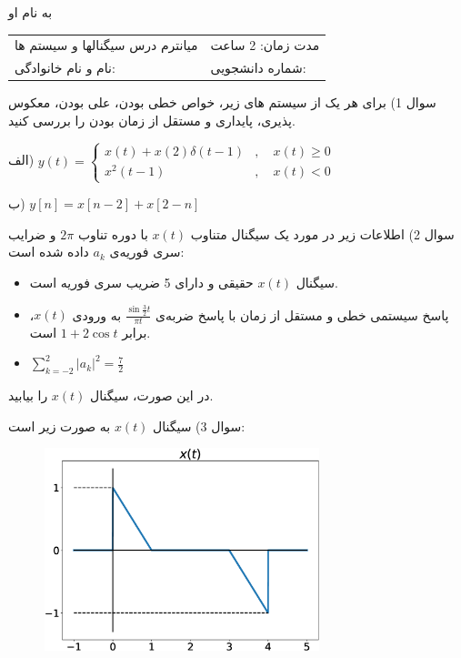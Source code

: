 \documentclass{article}
\begin{document}
{
\huge


\begin{center}
به نام او

\begin{table}[h]
\centering
\Large
\begin{tabular}{p{90mm}p{50mm}}
میانترم درس سیگنالها و سیستم ها
&
مدت زمان: 2 ساعت
\\
نام و نام خانوادگی: 
&
شماره دانشجویی:
\end{tabular}
\end{table}
\end{center}
}
\hrulefill

\large

سوال 1) برای هر یک از سیستم های زیر، خواص خطی بودن، علی بودن، معکوس پذیری، پایداری و مستقل از زمان بودن را بررسی کنید.

الف)
$
y(t)=\begin{cases}
x(t)+x(2)\delta(t-1)&,\quad x(t)\ge 0\\
x^2(t-1)&,\quad x(t)< 0
\end{cases}
$

ب) 
$
y[n]=x[n-2]+x[2-n]
$


\newpage

سوال 2) اطلاعات زیر در مورد یک سیگنال متناوب
$
x(t)
$
با دوره تناوب
$
2\pi
$
و ضرایب سری فوریه‌ی 
$
a_k
$
داده شده است:
\begin{itemize}
\item
سیگنال 
$
x(t)
$
حقیقی و دارای 5 ضریب سری فوریه است.
\item
پاسخ سیستمی خطی و مستقل از زمان با پاسخ ضربه‌ی 
$
\frac{\sin \frac{3}{2}t}{\pi t}
$
به ورودی 
$
x(t)
$،
برابر
$
1+2\cos t
$
است.
\item
$
\sum_{k=-2}^{2}|a_k|^2=\frac{7}{2}
$
\end{itemize}
در این صورت، سیگنال 
$
x(t)
$
را بیابید.

\newpage

سوال 3) سیگنال 
$
x(t)
$
به صورت زیر است:
\begin{figure}[h]
\centering
\includegraphics[width=80mm]{midterm_q3.eps}
\end{figure}
\end{document}
